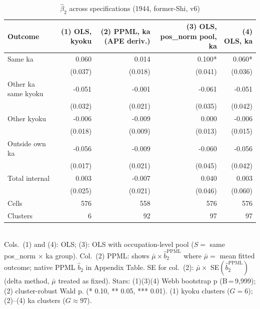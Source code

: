\begin{table}[!htbp]
  \centering
  \caption{$\hat{\beta}_2$ across specifications (1944, former-Shi, v6)}
  \label{tab:b2_4specs_v6}
  \begin{tabular}{lrrrr}
    \hline\hline
    Outcome & (1) OLS, kyoku & (2) PPML, ka (APE deriv.) & (3) OLS, pos\_norm pool, ka & (4) OLS, ka \\
    \hline
    Same ka & 0.060 & 0.014 & 0.100* & 0.060* \\
     & (0.037) & (0.018) & (0.041) & (0.036) \\
    Other ka same kyoku & -0.051 & -0.001 & -0.061 & -0.051 \\
     & (0.032) & (0.021) & (0.035) & (0.042) \\
    Other kyoku & -0.006 & -0.009 & 0.000 & -0.006 \\
     & (0.018) & (0.009) & (0.013) & (0.015) \\
    Outside own ka & -0.056 & -0.009 & -0.060 & -0.056 \\
     & (0.017) & (0.021) & (0.045) & (0.042) \\
    Total internal & 0.003 & -0.007 & 0.040 & 0.003 \\
     & (0.025) & (0.021) & (0.046) & (0.060) \\
    \hline
    Cells & 576 & 558 & 576 & 576 \\
    Clusters & 6 & 92 & 97 & 97 \\
    \hline\hline
  \end{tabular}
  \\[4pt]
  \footnotesize
  Cols.~(1) and (4): OLS; (3): OLS with occupation-level pool ($S =$ same pos\_norm $\times$ ka group).
  Col.~(2) PPML: shows $\bar{\mu} \times \hat{b}_2^{\text{PPML}}$ where $\bar{\mu} =$ mean fitted outcome;
  native PPML $\hat{b}_2$ in Appendix Table.
  SE for col.~(2): $\bar{\mu} \times$ SE$(\hat{b}_2^{\text{PPML}})$ (delta method, $\bar{\mu}$ treated as fixed).
  Stars: (1)(3)(4) Webb bootstrap p (B\,=\,9{,}999); (2) cluster-robust Wald p.
  (* 0.10, ** 0.05, *** 0.01).
  (1) kyoku clusters ($G=6$); (2)--(4) ka clusters ($G\approx 97$).
\end{table}
